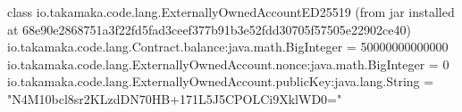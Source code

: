 \begin{shellbox}\begin{ttlst}
class io.takamaka.code.lang.ExternallyOwnedAccountED25519 (from jar installed at 68e90e2868751a3f22fd5fad3ceef377b91b3e52fdd30705f57505e22902ce40)
  io.takamaka.code.lang.Contract.balance:java.math.BigInteger = 50000000000000
  io.takamaka.code.lang.ExternallyOwnedAccount.nonce:java.math.BigInteger = 0
  io.takamaka.code.lang.ExternallyOwnedAccount.publicKey:java.lang.String = "N4M10bcl8sr2KLzdDN70HB+171L5J5CPOLCi9XklWD0="
\end{ttlst}\end{shellbox}
